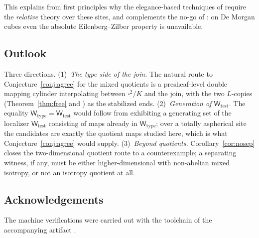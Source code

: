 \documentclass[11pt]{amsart}
\theoremstyle{definition}
\newcommand{\Wtest}{\mathsf{W}_{\mathrm{test}}}
\newcommand{\Wtype}{\mathsf{W}_{\mathrm{type}}}
\newcommand{\Kl}{K}
\begin{document}
This explains from first principles why the elegance-based
techniques of \cite{CS} require the \emph{relative} theory over
these sites, and complements the no-go of \cite{PaperL}: on De
Morgan cubes even the absolute Eilenberg--Zilber property is
unavailable.

\subsection*{Outlook}
Three directions.  (1)~\emph{The type side of the join.}  The
natural route to Conjecture~\ref{conj:agree} for the mixed
quotients is a presheaf-level double mapping cylinder
interpolating between $\square^2/\Kl$ and the join, with the two
$L$-copies (Theorem~\ref{thm:free} and \cite{PaperK}) as the
stabilized ends.  (2)~\emph{Generation of $\Wtest$.}  The equality
$\Wtype = \Wtest$ would follow from exhibiting a generating set of
the localizer $\Wtest$ consisting of maps already in $\Wtype$;
over a totally aspherical site the candidates are exactly the
quotient maps studied here, which is what
Conjecture~\ref{conj:agree} would supply.  (3)~\emph{Beyond
  quotients.}  Corollary~\ref{cor:nosep} closes the
two-dimensional quotient route to a counterexample; a separating
witness, if any, must be either higher-dimensional with
non-abelian mixed isotropy, or not an isotropy quotient at all.

\subsection*{Acknowledgements}
The machine verifications were carried out with the toolchain of
the accompanying artifact \cite{Artifact}.
\end{document}

